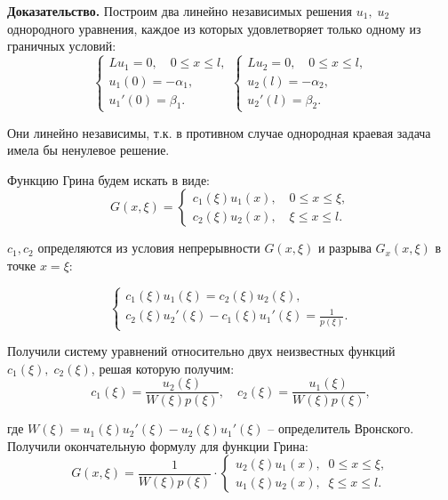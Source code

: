 \textbf{Доказательство.} Построим два линейно независимых решения $u_1, \; u_2$ однородного уравнения, каждое из которых удовлетворяет только одному из граничных условий:
\begin{equation*}
    \begin{cases}
        L u_1 = 0, \quad 0 \leq x \leq l,\\
        u_1(0) = -\alpha_1,\\
        u_1'(0) = \beta_1.
    \end{cases}
    \begin{cases}
        L u_2 = 0, \quad 0 \leq x \leq l,\\
        u_2(l) = -\alpha_2,\\
        u_2'(l) = \beta_2.
    \end{cases}
\end{equation*}

Они линейно независимы, т.к. в противном случае однородная краевая задача имела бы ненулевое решение.

Функцию Грина будем искать в виде: $$G(x, \xi) = 
\begin{cases} 
c_1(\xi) u_1(x), \quad 0 \leq x \leq \xi, \\
c_2(\xi) u_2(x), \quad \xi \leq x \leq l.
\end{cases}$$

$c_1, c_2$ определяются из условия непрерывности $G(x, \xi)$ и разрыва $G_x(x, \xi)$ в точке $x = \xi$:

\begin{equation*}
    \begin{cases}
        c_1(\xi) u_1(\xi) = c_2(\xi) u_2(\xi), \\
        c_2(\xi) u_2'(\xi) - c_1(\xi) u_1'(\xi) = \frac{1}{p(\xi)}.
    \end{cases}
\end{equation*}

Получили систему уравнений относительно двух неизвестных функций $c_1(\xi), \; c_2(\xi)$, решая которую получим:
$$c_1(\xi) = \frac{u_2(\xi)}{W(\xi) p(\xi)}, \quad c_2(\xi) = \frac{u_1(\xi)}{W(\xi) p(\xi)},$$

где $W(\xi) = u_1(\xi) u_2'(\xi) - u_2(\xi) u_1'(\xi)$ -- определитель Вронского.\\

Получили окончательную формулу для функции Грина: 
\begin{equation} \label{eq13.2}
    G(x, \xi) = \frac{1}{W(\xi) p(\xi)} \cdot  
\begin{cases}
    u_2(\xi) u_1(x), \;\; 0 \leq x \leq \xi, \\
    u_1(\xi) u_2(x), \;\; \xi \leq x \leq l.
\end{cases}
\end{equation}

